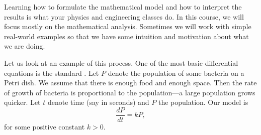 Learning how to formulate the mathematical model and how to interpret the
results is what your physics and engineering classes do.  In this
course, we will focus mostly on the mathematical analysis.  Sometimes we will
work with simple real-world examples so that we have some intuition and
motivation about what we are doing.

Let us look at 
an example of this process.
One of the most basic differential equations
is the standard \emph{}.
Let $P$ denote the population 
of some bacteria on a Petri dish.  We assume that there is enough food
and enough space.  Then the rate of growth of bacteria is proportional
to the population---a large population grows quicker.  Let $t$ denote
time (say in seconds) and $P$ the population.  Our model
is
\begin{equation*}
\frac{dP}{dt} = kP ,
\end{equation*}
for some positive constant $k > 0$.

